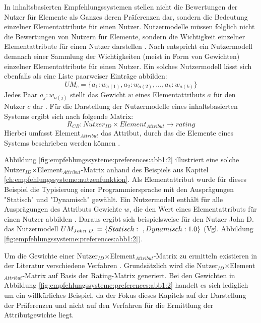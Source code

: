 In inhaltsbasierten Empfehlungssystemen stellen nicht die Bewertungen der Nutzer für Elemente als Ganzes deren Präferenzen dar, sondern die Bedeutung einzelner Elementattribute für einen Nutzer.
Nutzermodelle müssen folglich nicht die Bewertungen von Nutzern für Elemente, sondern die Wichtigkeit einzelner Elementattribute für einen Nutzer darstellen \cite[S. 42]{berkovsky:2:article}.
Nach \textcite[S. 42]{berkovsky:2:article} entspricht ein Nutzermodell demnach einer Sammlung der Wichtigkeiten (meist in Form von Gewichten) einzelner Elementattribute für einen Nutzer.
Ein solches Nutzermodell lässt sich ebenfalls als eine Liste paarweiser Einträge abbilden:
\begin{equation}\label{eq7}
    UM_{c} = \{a_{1}:w_{a(1)}, a_{2}:w_{a(2)}, ..., a_{k}:w_{a(k)}\}
\end{equation}
Jedes Paar $a_{j}:w_{a(j)}$ stellt das Gewicht $w$ eines Elementattributs $a$ für den Nutzer $c$ dar \cite[S. 42]{berkovsky:2:article}.
Für die Darstellung der Nutzermodelle eines inhaltsbasierten Systems ergibt sich nach \textcite[S. 251]{berkovsky:article} folgende Matrix:
\begin{equation}\label{eq8}
    R_{CB}: Nutzer_{ID} \times Element_{Attribut} \rightarrow rating
\end{equation}
Hierbei umfasst Element$_{Attribut}$ das Attribut, durch das die Elemente eines Systems beschrieben werden können \cite[S. 251]{berkovsky:article}.

Abbildung \ref{fig:empfehlungssysteme:preferences:abb1:2} illustriert eine solche Nutzer$_{ID}$$\times$Element$_{Attribut}$-Matrix anhand des Beispiels aus Kapitel \ref{ch:empfehlungssysteme:nutzenfunktion}.
Als Elementattribut wurde für dieses Beispiel die Typisierung einer Programmiersprache mit den Ausprägungen "Statisch" und "Dynamisch" gewählt.
Ein Nutzermodell enthält für alle Ausprägungen des Attributs Gewichte $w$, die den Wert eines Elementattributs für einen Nutzer abbilden \cite[S. 251]{berkovsky:article}.
Daraus ergibt sich beispielsweise für den Nutzer John D. das Nutzermodell $UM_{John\textnormal{ }D.} = \{Statisch:\textnormal{ }, Dynamisch: 1.0\}$ (Vgl. Abbildung \ref{fig:empfehlungssysteme:preferences:abb1:2}).

Um die Gewichte einer Nutzer$_{ID}$$\times$Element$_{Attribut}$-Matrix zu ermitteln existieren in der Literatur verschiedene Verfahren \cite[S. 42]{berkovsky:2:article}.
Grundsätzlich wird die Nutzer$_{ID}$$\times$Element$_{Attribut}$-Matrix auf Basis der Rating-Matrix generiert.
Bei den Gewichten in Abbildung \ref{fig:empfehlungssysteme:preferences:abb1:2} handelt es sich lediglich um ein willkürliches Beispiel, da der Fokus dieses Kapitels auf der Darstellung der Präferenzen und nicht auf den Verfahren für die Ermittlung der Attributgewichte liegt.

